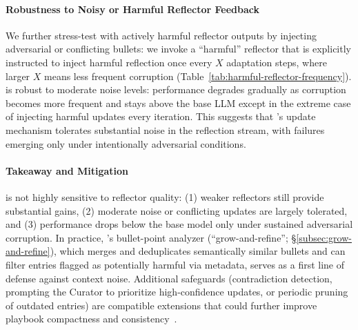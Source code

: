 \paragraph{Robustness to Noisy or Harmful Reflector Feedback}
We further stress-test \name with actively harmful reflector outputs by injecting adversarial or conflicting bullets: we invoke a ``harmful'' reflector that is explicitly instructed to inject harmful reflection once every $X$ adaptation steps, where larger $X$ means less frequent corruption (Table~\ref{tab:harmful-reflector-frequency}). 
\name is robust to moderate noise levels: performance degrades gradually as corruption becomes more frequent and stays above the base LLM except in the extreme case of injecting harmful updates every iteration. 
This suggests that \name's update mechanism tolerates substantial noise in the reflection stream, with failures emerging only under intentionally adversarial conditions.

\paragraph{Takeaway and Mitigation}
\name is not highly sensitive to reflector quality: (1) weaker reflectors still provide substantial gains, (2) moderate noise or conflicting updates are largely tolerated, and (3) performance drops below the base model only under sustained adversarial corruption.
In practice, \name's bullet-point analyzer (``grow-and-refine''; \S\ref{subsec:grow-and-refine}), which merges and deduplicates semantically similar bullets and can filter entries flagged as potentially harmful via metadata, serves as a first line of defense against context noise.
Additional safeguards (\eg contradiction detection, prompting the Curator to prioritize high-confidence updates, or periodic pruning of outdated entries) are compatible extensions that could further improve playbook compactness and consistency~\citep{zhou2024defending}.

\begin{table}
  \centering
  \small
  \caption{\textbf{Weaker Reflector Models on FiNER.} We vary the Reflector while keeping the Generator/Curator fixed. Parentheses report deltas vs.\ the base LLM.}
  \label{tab:weaker-reflector}
\end{table}

